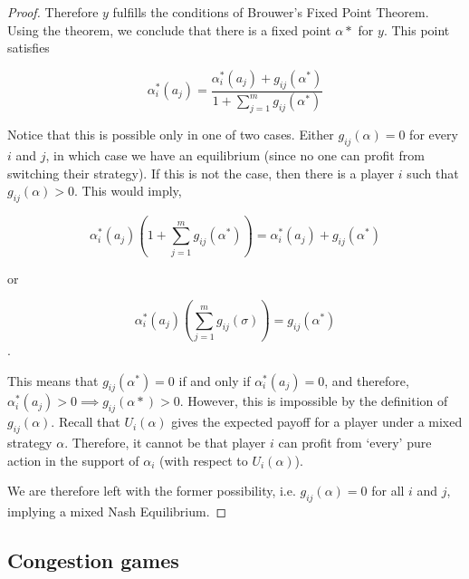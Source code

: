 \documentclass[a4paper,11pt]{article}
\begin{document}
\begin{proof}
Therefore $y$ fulfills the conditions of Brouwer's Fixed Point Theorem. Using the theorem, we conclude that there is a fixed point $\alpha*$ for $y$. This point satisfies

$$\alpha^*_{i}(a_j) = \frac{\alpha^*_{i}(a_j)+g_{ij}(\alpha^*)}{1+\sum_{j=1}^{m}{g_{ij}(\alpha^*)}}$$

Notice that this is possible only in one of two cases. Either $g_{ij}(\alpha)=0$ for every $i$ and $j$, in which case we have an equilibrium (since no one can profit from switching their strategy). If this is not the case, then there is a player $i$ such that $g_{ij}(\alpha)>0$. This would imply,

$$\alpha^*_{i}(a_j)\left(1+\sum_{j=1}^{m}{g_{ij}(\alpha^*)}\right) = \alpha^*_{i}(a_j)+g_{ij}(\alpha^*)$$

or

$$\alpha^*_{i}(a_j)\left(\sum_{j=1}^{m}{g_{ij}(\sigma)}\right) = g_{ij}(\alpha^*)$$.

This means that $g_{ij}(\alpha^*)=0$ if and only if $\alpha^*_{i}(a_j)=0$, and therefore, $\alpha^*_{i}(a_j)>0 \implies g_{ij}(\alpha*)>0$. However, this is impossible by the definition of $g_{ij}(\alpha)$. Recall that $U_i(\alpha)$ gives the expected payoff for a player under a mixed strategy $\alpha$. Therefore, it cannot be that player $i$ can profit from
`every' pure action in the support of $\alpha_i$ (with respect to $U_i(\alpha)$).

We are therefore left with the former possibility, i.e. $g_{ij}(\alpha)=0$ for all $i$ and $j$, implying a mixed Nash Equilibrium.
\end{proof}


\subsection{Congestion games}
\end{document}
